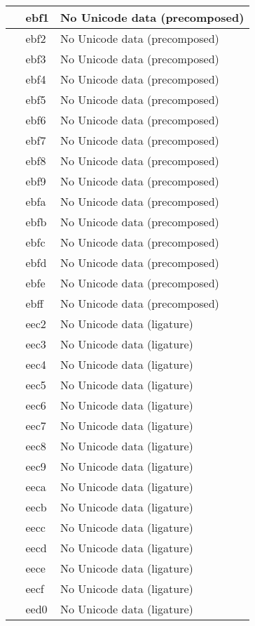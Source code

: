 \documentclass[12pt,letterpaper,openany]{book}
\begin{document}
\begin{center}
\begin{supertabular}{|m{0.25in}|m{0.5in}|m{4in}|}
 & ebf1 & No Unicode data (precomposed)\\\hline
 & ebf2 & No Unicode data (precomposed)\\\hline
 & ebf3 & No Unicode data (precomposed)\\\hline
 & ebf4 & No Unicode data (precomposed)\\\hline
 & ebf5 & No Unicode data (precomposed)\\\hline
 & ebf6 & No Unicode data (precomposed)\\\hline
 & ebf7 & No Unicode data (precomposed)\\\hline
 & ebf8 & No Unicode data (precomposed)\\\hline
 & ebf9 & No Unicode data (precomposed)\\\hline
 & ebfa & No Unicode data (precomposed)\\\hline
 & ebfb & No Unicode data (precomposed)\\\hline
 & ebfc & No Unicode data (precomposed)\\\hline
 & ebfd & No Unicode data (precomposed)\\\hline
 & ebfe & No Unicode data (precomposed)\\\hline
 & ebff & No Unicode data (precomposed)\\\hline
 & eec2 & No Unicode data (ligature)\\\hline
 & eec3 & No Unicode data (ligature)\\\hline
 & eec4 & No Unicode data (ligature)\\\hline
 & eec5 & No Unicode data (ligature)\\\hline
 & eec6 & No Unicode data (ligature)\\\hline
 & eec7 & No Unicode data (ligature)\\\hline
 & eec8 & No Unicode data (ligature)\\\hline
 & eec9 & No Unicode data (ligature)\\\hline
 & eeca & No Unicode data (ligature)\\\hline
 & eecb & No Unicode data (ligature)\\\hline
 & eecc & No Unicode data (ligature)\\\hline
 & eecd & No Unicode data (ligature)\\\hline
 & eece & No Unicode data (ligature)\\\hline
 & eecf & No Unicode data (ligature)\\\hline
 & eed0 & No Unicode data (ligature)\\\hline

\end{supertabular}
\end{center}
\end{document}
